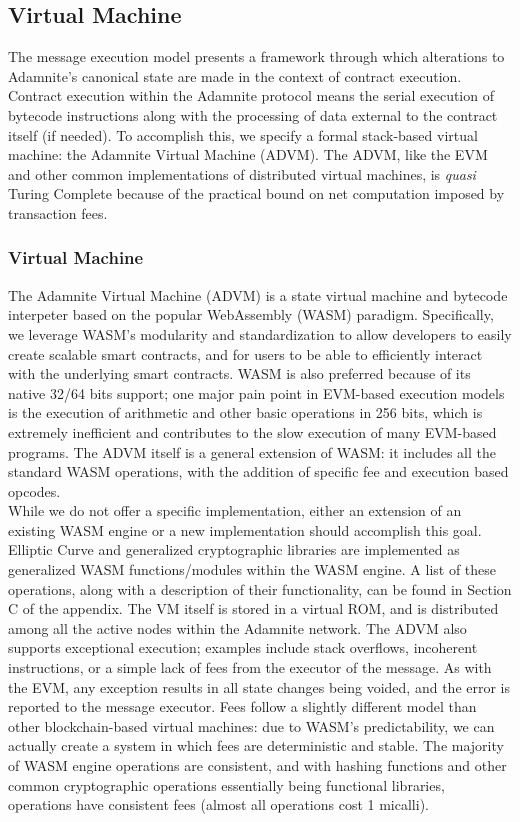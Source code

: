 \documentclass[conference]{IEEEtran}
\begin{document}
\subsection{Virtual Machine}
The message execution model presents a framework through which alterations to Adamnite's canonical state are made in the context of contract execution. Contract execution within the Adamnite protocol means the serial execution of bytecode instructions along with the processing of data external to the contract itself (if needed). To accomplish this, we specify a formal stack-based virtual machine: the Adamnite Virtual Machine (ADVM). The ADVM, like the EVM and other common implementations of distributed virtual machines, is \emph{quasi} Turing Complete because of the practical bound on net computation imposed by transaction fees. 
\subsubsection{Virtual Machine}
The Adamnite Virtual Machine (ADVM) is a state virtual machine and bytecode interpeter based on the popular WebAssembly (WASM) paradigm. Specifically, we leverage WASM's modularity and standardization to allow developers to easily create scalable smart contracts, and for users to be able to efficiently interact with the underlying smart contracts. WASM is also preferred because of its native 32/64 bits support; one major pain point in EVM-based execution models is the execution of arithmetic and other basic operations in 256 bits, which is extremely inefficient and contributes to the slow execution of many EVM-based programs. The ADVM itself is a general extension of WASM: it includes all the standard WASM operations, with the addition of specific fee and execution based opcodes.\\
While we do not offer a specific implementation, either an extension of an existing WASM engine or a new implementation should accomplish this goal. Elliptic Curve and generalized cryptographic libraries are implemented as generalized WASM functions/modules within the WASM engine. A list of these operations, along with a description of their functionality, can be found in Section C of the appendix. The VM itself is stored in a virtual ROM, and is distributed among all the active nodes within the Adamnite network. The ADVM also supports exceptional execution; examples include stack overflows, incoherent instructions, or a simple lack of fees from the executor of the message. As with the EVM, any exception results in all state changes being voided, and the error is reported to the message executor. Fees follow a slightly different model than other blockchain-based virtual machines: due to WASM's predictability, we can actually create a system in which fees are deterministic and stable. The majority of WASM engine operations are consistent, and with hashing functions and other common cryptographic operations essentially being functional libraries, operations have consistent fees (almost all operations cost 1 micalli).\\
\end{document}

